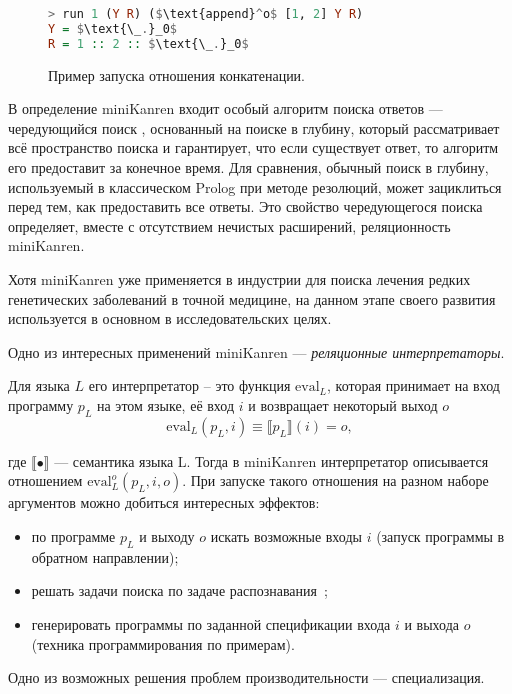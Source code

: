 \begin{figure}[h!]
\begin{lstlisting}[mathescape,language=Haskell,extendedchars=\true,frame=single,basicstyle=\ttfamily]
> run 1 (Y R) ($\text{append}^o$ [1, 2] Y R)
Y = $\text{\_.}_0$
R = 1 :: 2 :: $\text{\_.}_0$
\end{lstlisting}
\caption{Пример запуска отношения конкатенации.}
\label{fig:appendoExample}
\end{figure}

В определение miniKanren входит особый алгоритм поиска ответов --- чередующийся поиск ,
основанный на поиске в глубину, который рассматривает всё пространство поиска и гарантирует,
что если существует ответ, то алгоритм его предоставит за конечное время.
Для сравнения, обычный поиск в глубину, используемый в классическом Prolog при методе резолюций, может зациклиться
перед тем, как предоставить все ответы. Это свойство чередующегося поиска определяет, вместе
с отсутствием нечистых расширений, реляционность miniKanren. 

Хотя miniKanren уже применяется в индустрии для поиска лечения редких генетических
заболеваний в точной медицине\cite{medMK},
на данном этапе своего развития используется в основном в исследовательских целях.

Одно из интересных применений miniKanren --- {\it реляционные интерпретаторы}.

Для языка $L$ его интерпретатор -- это функция $\text{eval}_L$, которая принимает
на вход программу $p_L$ на этом языке, её вход $i$ и возвращает некоторый выход $o$
\[ \text{eval}_L (p_L, i) \equiv \llbracket p_L \rrbracket (i) = o,\]

где $\llbracket \bullet \rrbracket $ --- семантика языка L.
Тогда в miniKanren интерпретатор описывается отношением $\text{eval}^o_L(p_L, i, o)$.
При запуске такого отношения на разном наборе аргументов можно добиться интересных эффектов:
\begin{itemize}
\item по программе $p_L$ и выходу $o$ искать возможные входы $i$ (запуск программы в обратном направлении);
\item решать задачи поиска по задаче распознавания~\cite{lozov};
\item генерировать программы по заданной спецификации входа $i$ и выхода $o$
(техника программирования по примерам)\cite{unifiedMK}.
\end{itemize}


Одно из возможных решения проблем производительности --- специализация.
